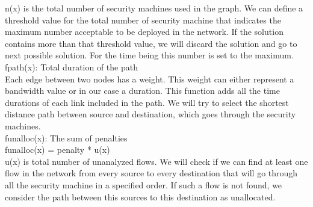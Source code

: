 \documentclass{article}
\begin{document}
 n(x) is the total number of security machines used in the graph. We can define a threshold value for the total number of security machine that indicates the maximum number acceptable to be deployed in the network. If the solution contains more than that threshold value, we will discard the solution and go to next possible solution. For the time being this number is set to the maximum.\\
 fpath(x): Total duration of the path\\
 Each edge between two nodes has a weight. This weight can either represent a bandwidth value or in our case a duration. This function adds all the time durations of each link included in the path. We will try to select the shortest distance path between source and destination, which goes through the security machines.\\
 funalloc(x): The sum of penalties\\
 funalloc(x) = penalty * u(x)\\
 u(x) is total number of unanalyzed flows. We will check if we can find at least one flow in the network from every source to every destination that will go through all the security machine in a specified order. If such a flow is not found, we consider the path between this sources to this destination as unallocated. 
\end{document}
